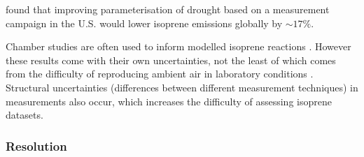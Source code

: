        \textcite{Jiang2018} found that improving  parameterisation of drought based on a measurement campaign in the U.S. would lower isoprene emissions globally by $\sim17\%$.
      
      
      Chamber studies are often used to inform modelled isoprene reactions \parencite[e.g.,][]{Paulot2009b}.
      However these results come with their own uncertainties, not the least of which comes from the difficulty of reproducing ambient air in laboratory conditions \parencite{Nguyen2014}.
      Structural uncertainties (differences between different measurement techniques) in measurements also occur, which increases the difficulty of assessing isoprene datasets.
      
      
    \subsubsection{Resolution}
      \label{LR:Models:Uncert:Resolution}
      
